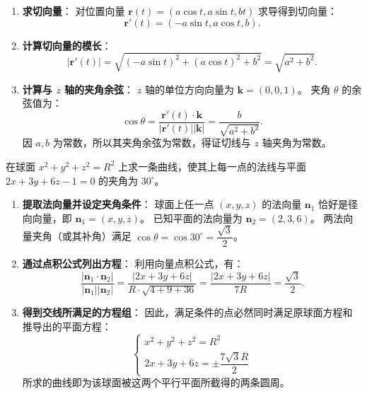 \documentclass[lang=cn,11pt]{elegantbook}
\begin{document}
\begin{solution}
\begin{enumerate}
  \item \textbf{求切向量}：
  对位置向量 $\boldsymbol r(t) = (a\cos t, a\sin t, bt)$ 求导得到切向量：
  \[
  \boldsymbol r'(t) = (-a\sin t, a\cos t, b).
  \]
  \item \textbf{计算切向量的模长}：
  \[
  |\boldsymbol r'(t)| = \sqrt{(-a\sin t)^2 + (a\cos t)^2 + b^2} = \sqrt{a^2+b^2}.
  \]
  \item \textbf{计算与 $z$ 轴的夹角余弦}：
  $z$ 轴的单位方向向量为 $\boldsymbol k = (0,0,1)$。
  夹角 $\theta$ 的余弦值为：
  \[
  \cos\theta = \frac{\boldsymbol r'(t) \cdot \boldsymbol k}{|\boldsymbol r'(t)| |\boldsymbol k|} = \frac{b}{\sqrt{a^2+b^2}}.
  \]
  因 $a, b$ 为常数，所以其夹角余弦为常数，得证切线与 $z$ 轴夹角为常数。
\end{enumerate}
\end{solution}



\begin{exercise}[球面上的定向曲线构造]
在球面 $x^2+y^2+z^2=R^2$ 上求一条曲线，使其上每一点的法线与平面 $2x+3y+6z-1=0$ 的夹角为 $30^\circ$。
\end{exercise}

\begin{solution}
\begin{enumerate}
  \item \textbf{提取法向量并设定夹角条件}：
  球面上任一点 $(x,y,z)$ 的法向量 $\boldsymbol n_1$ 恰好是径向向量，即 $\boldsymbol n_1 = (x,y,z)$。
  已知平面的法向量为 $\boldsymbol n_2 = (2,3,6)$。
  两法向量夹角（或其补角）满足 $\cos\theta = \cos 30^\circ = \dfrac{\sqrt{3}}{2}$。
  \item \textbf{通过点积公式列出方程}：
  利用向量点积公式，有：
  \[
  \frac{|\boldsymbol n_1 \cdot \boldsymbol n_2|}{|\boldsymbol n_1| |\boldsymbol n_2|} = \frac{|2x+3y+6z|}{R \cdot \sqrt{4+9+36}} = \frac{|2x+3y+6z|}{7R} = \frac{\sqrt{3}}{2}.
  \]
  \item \textbf{得到交线所满足的方程组}：
  因此，满足条件的点必然同时满足原球面方程和推导出的平面方程：
  \[
  \begin{cases}
    x^2+y^2+z^2=R^2 \\[4pt]
    2x+3y+6z=\pm \dfrac{7\sqrt{3}R}{2}
  \end{cases}
  \]
  所求的曲线即为该球面被这两个平行平面所截得的两条圆周。
\end{enumerate}
\end{solution}
\end{document}
